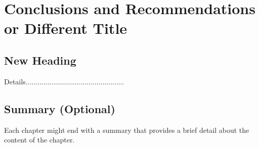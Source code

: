\chapter{Conclusions and Recommendations or Different Title}

    


\section{New Heading}
\begin{justify}
    Details..................................................
\end{justify}


\section{Summary (Optional)}
\begin{justify}
    Each chapter might end with a summary that provides a brief detail about the content of the chapter.
\end{justify}


\clearpage